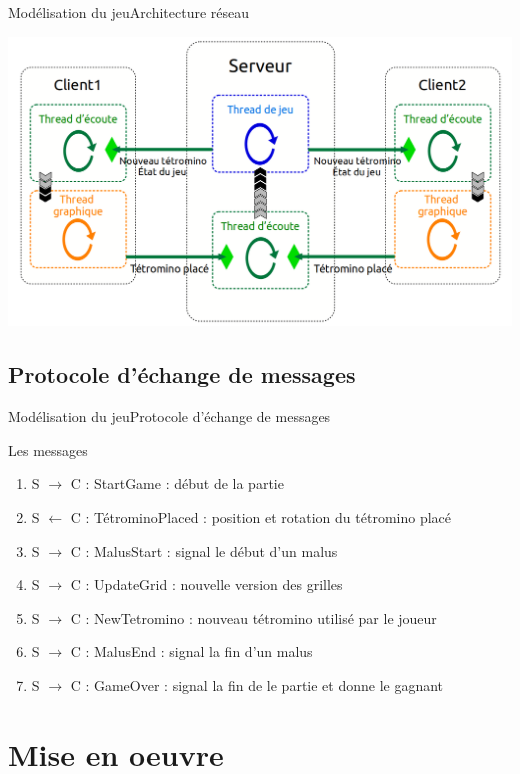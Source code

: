 \documentclass[french]{beamer}
\begin{document}
		\begin{frame}{Modélisation du jeu}{Architecture réseau}
			\begin{center}
				\includegraphics[scale=0.25]{img/archi_reseau.png}
			\end{center}
		\end{frame}

	\subsection{Protocole d'échange de messages}

		\begin{frame}{Modélisation du jeu}{Protocole d'échange de messages}
			\begin{block}{Les messages}
				\begin{enumerate}
					\item S $\to$ C : StartGame : début de la partie
					\item S $\gets$ C : TétrominoPlaced : position et rotation du tétromino placé
					\item S $\to$ C : MalusStart : signal le début d'un malus
					\item S $\to$ C : UpdateGrid : nouvelle version des grilles
					\item S $\to$ C : NewTetromino : nouveau tétromino utilisé par le joueur
					\item S $\to$ C : MalusEnd : signal la fin d'un malus
					\item S $\to$ C : GameOver : signal la fin de le partie et donne le gagnant
				\end{enumerate}
			\end{block}
		\end{frame}

\section{Mise en oeuvre}
\end{document}
